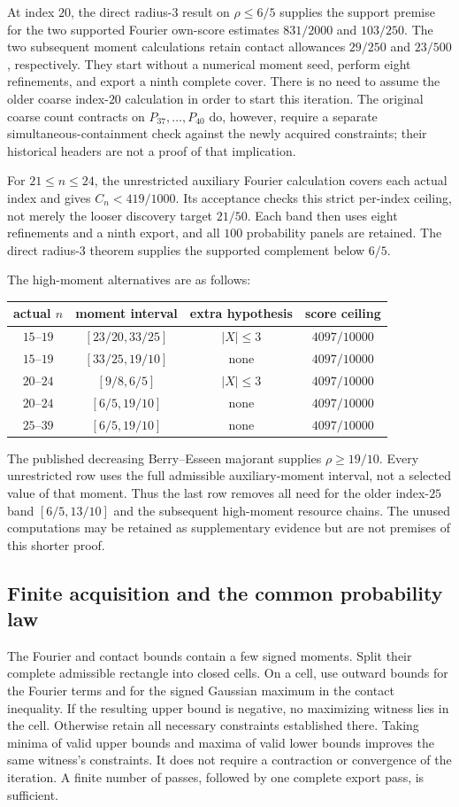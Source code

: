 At index $20$, the direct radius-$3$ result on $\rho\le6/5$ supplies
the support premise for the two supported Fourier own-score estimates
$831/2000$ and $103/250$. The two subsequent moment calculations
retain contact allowances $29/250$ and $23/500$, respectively.
They start without a numerical moment seed, perform eight refinements,
and export a ninth complete cover. There is no need to assume the
older coarse index-$20$ calculation in order to start this iteration.
The original coarse count contracts on $P_{37},\ldots,P_{40}$ do,
however, require a separate simultaneous-containment check against the
newly acquired constraints; their historical headers are not a proof
of that implication.

For $21\le n\le24$, the unrestricted auxiliary Fourier calculation
covers each actual index and gives $C_n<419/1000$. Its acceptance
checks this strict per-index ceiling, not merely the looser discovery
target $21/50$. Each band then uses eight refinements and a ninth
export, and all $100$ probability panels are retained. The direct
radius-$3$ theorem supplies the supported complement below $6/5$.

The high-moment alternatives are as follows:
\begin{center}\small
\begin{tabular}{c|c|c|c}
actual $n$ & moment interval & extra hypothesis & score ceiling\\\hline
$15$--$19$ & $[23/20,33/25]$ & $|X|\le3$ & $4097/10000$\\
$15$--$19$ & $[33/25,19/10]$ & none & $4097/10000$\\
$20$--$24$ & $[9/8,6/5]$ & $|X|\le3$ & $4097/10000$\\
$20$--$24$ & $[6/5,19/10]$ & none & $4097/10000$\\
$25$--$39$ & $[6/5,19/10]$ & none & $4097/10000$
\end{tabular}
\end{center}
The published decreasing Berry--Esseen majorant supplies $\rho\ge19/10$.
Every unrestricted row uses the full admissible auxiliary-moment
interval, not a selected value of that moment. Thus the last row
removes all need for the older index-$25$ band
$[6/5,13/10]$ and the subsequent high-moment resource chains. The
unused computations may be retained as supplementary evidence but
are not premises of this shorter proof.

\subsection{Finite acquisition and the common probability law}
The Fourier and contact bounds contain a few signed moments. Split
their complete admissible rectangle into closed cells. On a cell,
use outward bounds for the Fourier terms and for the signed Gaussian
maximum in the contact inequality. If the resulting upper bound is
negative, no maximizing witness lies in the cell. Otherwise retain
all necessary constraints established there. Taking minima of valid
upper bounds and maxima of valid lower bounds improves the same
witness's constraints. It does not require a contraction or convergence
of the iteration. A finite number of passes, followed by one complete
export pass, is sufficient.

